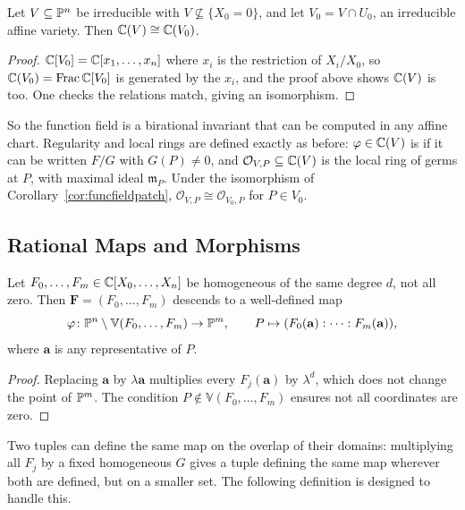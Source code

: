 \documentclass[a4paper]{scrartcl}
\newcommand{\V}{\mathbb{V}}
\newcommand{\mm}{\mathfrak{m}}
\newcommand{\Oh}{\mathcal{O}}
\newcommand{\Frac}{\operatorname{Frac}}
\begin{document}
\begin{corollary}\label{cor:funcfieldpatch}
	Let $V \subseteq \mathbb{P}^n$ be irreducible with $V \not\subseteq \{X_0 = 0\}$, and let $V_0 = V \cap U_0$, an irreducible affine variety. Then $\mathbb{C}(V) \cong \mathbb{C}(V_0)$.
\end{corollary}

\begin{proof}
	$\mathbb{C}[V_0] = \mathbb{C}[x_1,\dots,x_n]$ where $x_i$ is the restriction of $X_i/X_0$, so $\C(V_0) = \Frac \C[V_0]$ is generated by the $x_i$, and the proof above shows $\mathbb{C}(V)$ is too. One checks the relations match, giving an isomorphism.
\end{proof}

So the function field is a birational invariant that can be computed in any affine chart. Regularity and local rings are defined exactly as before: $\varphi \in \mathbb{C}(V)$ is  if it can be written $F/G$ with $G(P) \neq 0$, and $\Oh_{V,P} \subseteq \C(V)$ is the local ring of germs at $P$, with maximal ideal $\mm_P$. Under the isomorphism of Corollary~\ref{cor:funcfieldpatch}, $\Oh_{V,P} \cong \Oh_{V_0,P}$ for $P \in V_0$.

\subsection{Rational Maps and Morphisms}

\begin{proposition}
	Let $F_0,\dots,F_m \in \mathbb{C}[X_0,\dots,X_n]$ be homogeneous of the same degree $d$, not all zero. Then $\mathbf F = (F_0,\dots,F_m)$ descends to a well-defined map
	$$\varphi \colon \PP^n \setminus \V(F_0,\dots,F_m) \to \PP^m, \qquad P \mapsto (F_0(\mathbf a) : \cdots : F_m(\mathbf a)),$$
	where $\mathbf a$ is any representative of $P$.
\end{proposition}

\begin{proof}
	Replacing $\mathbf a$ by $\lambda\mathbf a$ multiplies every $F_j(\mathbf a)$ by $\lambda^d$, which does not change the point of $\mathbb{P}^m$. The condition $P \notin \V(F_0,\dots,F_m)$ ensures not all coordinates are zero.
\end{proof}

Two tuples can define the same map on the overlap of their domains: multiplying all $F_j$ by a fixed homogeneous $G$ gives a tuple defining the same map wherever both are defined, but on a smaller set. The following definition is designed to handle this.
\end{document}
